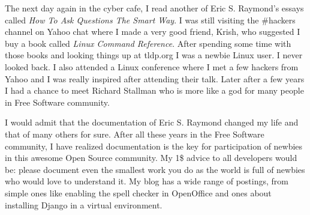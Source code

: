 The next day again in the cyber cafe, I read another of Eric S. Raymond's essays
called \textit{How To Ask Questions The Smart Way}. I was still visiting the \#hackers channel on
Yahoo chat where I made a very good friend, Krish, who suggested I
buy a book called \textit{Linux Command Reference}. After spending some time
with those books and looking things up at tldp.org I was a newbie
Linux user. I never looked back. I also attended a Linux conference
where I met a few hackers from Yahoo and I was really inspired after
attending their talk. Later after a few years I had a chance to meet Richard Stallman
who is more like a god for many people in Free Software community.

I would admit that the documentation of Eric S. Raymond changed my life and that of
many others for sure. After all these years in the Free Software
community, I have realized documentation is the key for participation
of newbies in this awesome Open Source community. My 1\$ advice to all
developers would be: please document even the smallest work you do as the world
is full of newbies who would love to understand it. My blog has a wide range of
postings, from simple ones like enabling the spell checker in OpenOffice
and ones about installing Django in a virtual environment.
